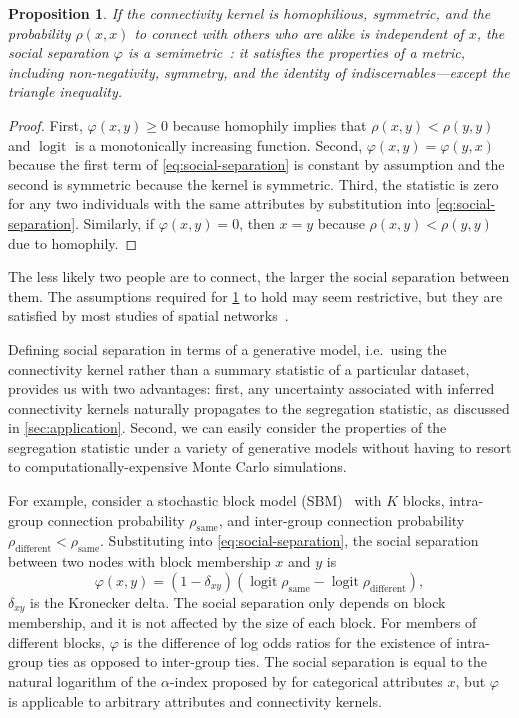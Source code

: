 \documentclass{scrartcl}
\DeclareMathOperator{\logit}{logit}
\newtheorem{prop}{Proposition}
\begin{document}
\begin{prop}\label{prop:segregations-semi-metric}
    If the connectivity kernel is homophilious, symmetric, and the probability $\rho(x,x)$ to connect with others who are alike is independent of $x$, the social separation $\varphi$ is a \emph{semimetric}~\cite{Wilson1931}: it satisfies the properties of a metric, including non-negativity, symmetry, and the identity of indiscernables---except the triangle inequality.
\end{prop}
\begin{proof}
    First, $\varphi(x,y)\geq0$ because homophily implies that $\rho(x, y)<\rho(y, y)$ and $\logit$ is a monotonically increasing function. Second, $\varphi(x,y)=\varphi(y,x)$ because the first term of \cref{eq:social-separation} is constant by assumption and the second is symmetric because the kernel is symmetric. Third, the statistic is zero for any two individuals with the same attributes by substitution into \cref{eq:social-separation}. Similarly, if $\varphi(x,y)=0$, then $x=y$ because $\rho(x, y)<\rho(y, y)$ due to homophily.
\end{proof}

The less likely two people are to connect, the larger the social separation between them. The assumptions required for \cref{prop:segregations-semi-metric} to hold may seem restrictive, but they are satisfied by most studies of spatial networks~\cite{Barnett2007,Lambiotte2008,Butts2012,Expert2011}.

Defining social separation in terms of a generative model, i.e.\ using the connectivity kernel rather than a summary statistic of a particular dataset, provides us with two advantages: first, any uncertainty associated with inferred connectivity kernels naturally propagates to the segregation statistic, as discussed in \cref{sec:application}. Second, we can easily consider the properties of the segregation statistic under a variety of generative models without having to resort to computationally-expensive Monte Carlo simulations.

For example, consider a stochastic block model (SBM)~\cite{Snijders2011} with $K$ blocks, intra-group connection probability $\rho_\mathrm{same}$, and inter-group connection probability $\rho_\mathrm{different}<\rho_\mathrm{same}$. Substituting into \cref{eq:social-separation}, the social separation between two nodes with block membership $x$ and $y$ is
\begin{equation}
    \varphi(x, y) = \left(1-\delta_{xy}\right)\left(\logit\rho_\mathrm{same}-\logit\rho_\mathrm{different}\right),\label{eq:social-separation-sbm}
\end{equation}
$\delta_{xy}$ is the Kronecker delta. The social separation only depends on block membership, and it is not affected by the size of each block. For members of different blocks, $\varphi$ is the difference of log odds ratios for the existence of intra-group ties as opposed to inter-group ties. The social separation is equal to the natural logarithm of the $\alpha$-index proposed by \textcite{Moody2001} for categorical attributes $x$, but $\varphi$ is applicable to arbitrary attributes and connectivity kernels.
\end{document}
